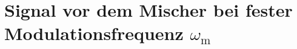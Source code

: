 
\section{Signal vor dem Mischer bei fester Modulationsfrequenz $\omega_\mathrm{m}$}
\label{sec:signalMischer}

